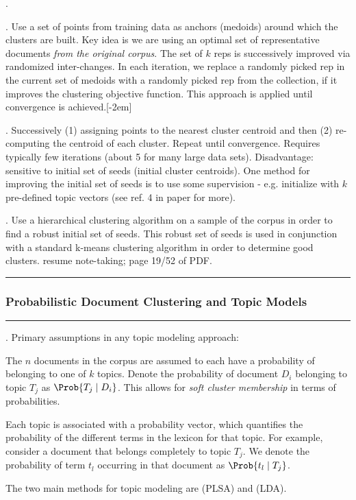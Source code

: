 \documentclass[11pt]{article}
\newcommand\myspace[1][]{\vspace{#1\bigskipamount}}
\newcommand\p{\Needspace{10\baselineskip} \noindent}
\newcommand\subsub[1]{\Needspace{15\baselineskip}\hrule\subsubsection{#1}\hrule}
\begin{document}
\myspace
\p {}. 
\begin{compactitem}
	\item {}. Use a set of points from training data as anchors (medoids) around which the clusters are built. Key idea is we are using an optimal set of representative documents \textit{from the original corpus}. The set of $k$ reps is successively improved via randomized inter-changes. In each iteration, we replace a randomly picked rep in the current set of medoids with a randomly picked rep from the collection, if it improves the clustering objective function. This approach is applied until convergence is achieved.[-2em]
	
	\item {}. Successively (1) assigning points to the nearest cluster centroid and then (2) re-computing the centroid of each cluster. Repeat until convergence. Requires typically few iterations (about 5 for many large data sets). Disadvantage: sensitive to initial set of seeds (initial cluster centroids). One method for improving the initial set of seeds is to use some supervision - e.g. initialize with $k$ pre-defined topic vectors (see ref. 4 in paper for more). 
\end{compactitem}

\myspace
\p {}. Use a hierarchical clustering
algorithm on a sample of the corpus in order to find a robust initial set of seeds. This robust set of seeds is used in conjunction with a standard k-means clustering algorithm in order to determine good clusters. resume note-taking; page 19/52 of PDF.

\myspace
\subsub{Probabilistic Document Clustering and Topic Models}
\myspace

\p {}. Primary assumptions in any topic modeling approach:
\begin{compactitem}
	\item The $n$ documents in the corpus are assumed to each have a probability of belonging to one of $k$ topics. Denote the probability of document $D_i$ belonging to topic $T_j$ as $\Prob{T_j \mid D_i}$. This allows for \textit{soft cluster membership} in terms of probabilities.
	
	\item Each topic is associated with a probability vector, which quantifies the probability of the different terms in the lexicon for that topic. For example, consider a document that belongs completely to topic $T_j$. We denote the probability of term $t_l$ occurring in that document as $\Prob{t_l \mid T_j}$. 
\end{compactitem}
The two main methods for topic modeling are  (PLSA) and  (LDA).
\end{document}
